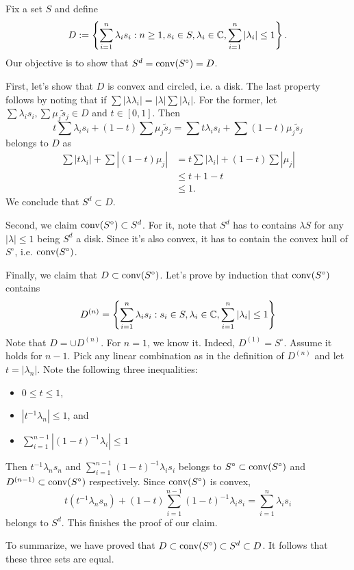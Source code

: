 \begin{solution}
    Fix a set $S$ and define
    \[D:=\left\{\sum_{i=1}^n \lambda_i s_i : n\geq 1, s_i \in S, \lambda_i \in \mathbb C, \sum_{i=1}^n |\lambda_i| \le 1\right\}.\]
    Our objective is to show that $S^d= \operatorname{conv}(S^\circ)=D$.

    First, let's show that $D$ is convex and circled, i.e. a disk. The last property follows by noting that if $\sum |\lambda\lambda_i| = |\lambda|\sum |\lambda_i|$. For the former, let $\sum\lambda_is_i,\sum\mu_j\tilde s_j\in D$ and $t\in [0,1]$. Then
    \[t\sum\lambda_is_i+(1-t)\sum\mu_j\tilde s_j = \sum t\lambda_is_i + \sum (1-t)\mu_j\tilde s_j\]
    belongs to $D$ as 
    \begin{align*}
        \sum |t\lambda_i| + \sum |(1-t)\mu_j| & = t\sum |\lambda_i| + (1-t)\sum |\mu_j|\\
        &\leq t+ 1-t\\
        &\leq 1.
    \end{align*}
    We conclude that $S^d\subset D$.

    Second, we claim $\operatorname{conv}(S^\circ)\subset S^d$. For it, note that $S^d$ has to contains $\lambda S$ for any $|\lambda|\leq 1$ being $S^d$ a disk. Since it's also convex, it has to contain the convex hull of $S^\circ$, i.e. $\operatorname{conv}(S^\circ)$.
    
    Finally, we claim that $D\subset \operatorname{conv}(S^\circ)$. Let's prove by induction that $\operatorname{conv}(S^\circ)$ contains 
    \[D^{(n)}=\left\{\sum_{i=1}^n \lambda_i s_i : s_i \in S, \lambda_i \in \mathbb C, \sum_{i=1}^n |\lambda_i| \le 1\right\}\]
    Note that $D=\cup D^{(n)}$. For $n=1$, we know it. Indeed, $D^{(1)}=S^\circ$. Assume it holds for $n-1$. Pick any linear combination as in the definition of $D^{(n)}$ and let $t=|\lambda_n|$. Note the following three inequalities:
    \begin{itemize}
        \item $0\leq t\leq 1$,
        \item $|t^{-1}\lambda_n| \leq 1$, and
        \item $\sum\limits_{i=1}^{n-1} |(1-t)^{-1}\lambda_i| \leq 1$
    \end{itemize}
    Then $t^{-1}\lambda_ns_n$ and $\sum\limits_{i=1}^{n-1} (1-t)^{-1}\lambda_is_i$ belongs to $S^\circ\subset \operatorname{conv}(S^\circ)$ and $D^{(n-1)}\subset \operatorname{conv}(S^\circ)$ respectively. Since $\operatorname{conv}(S^\circ)$ is convex,
    \[t(t^{-1}\lambda_ns_n) + (1-t)\sum_{i=1}^{n-1} (1-t)^{-1}\lambda_is_i =\sum_{i=1}^n \lambda_i s_i  \]
    belongs to $S^d$. This finishes the proof of our claim.

    To summarize, we have proved that $D\subset \operatorname{conv}(S^\circ) \subset S^d\subset D$. It follows that these three sets are equal.
\end{solution}

